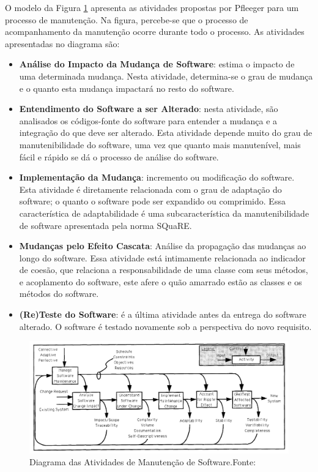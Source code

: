 O modelo da Figura \ref{img:modelo_manutencao} apresenta as atividades propostas por Pfleeger \cite{pfleeger_framework_1990} para um processo de manutenção. Na figura, percebe-se que o processo de acompanhamento da manutenção ocorre durante todo o processo. As atividades apresentadas no diagrama são:

\begin{itemize}
\item \textbf{Análise do Impacto da Mudança de Software}: estima o impacto de uma determinada mudança. Nesta atividade, determina-se o grau de mudança e o quanto esta mudança impactará no resto do software. 
\item \textbf{Entendimento do Software a ser Alterado}: nesta atividade, são analisados os códigos-fonte do software para entender a mudança e a integração do que deve ser alterado. Esta atividade depende muito do grau de manutenibilidade do software, uma vez que quanto mais manutenível, mais fácil e rápido se dá o processo de análise do software.
\item \textbf{Implementação da Mudança}: incremento ou modificação do software. Esta atividade é diretamente relacionada com o grau de adaptação do software; o quanto o software pode ser expandido ou comprimido. Essa característica de adaptabilidade é uma subcaracterística da manutenibilidade de software apresentada pela norma SQuaRE. 
\item \textbf{Mudanças pelo Efeito Cascata}: Análise da propagação das mudanças ao longo do software. Essa atividade está intimamente relacionada ao indicador de coesão, que relaciona a responsabilidade de uma classe com seus métodos, e acoplamento do software, este afere o quão amarrado estão as classes e os métodos do software.
\item \textbf{(Re)Teste do Software}: é a última atividade antes da entrega do software alterado. O software é testado novamente sob a perspectiva do novo requisito.
\end{itemize}

\graphicspath{{figuras/}}
\begin{figure}[h!]
\centering
\includegraphics[scale=0.50]{Manutencao}
\caption{Diagrama das Atividades de Manutenção de Software.Fonte:\cite{pfleeger_framework_1990}}
\label{img:modelo_manutencao}
\end{figure}

